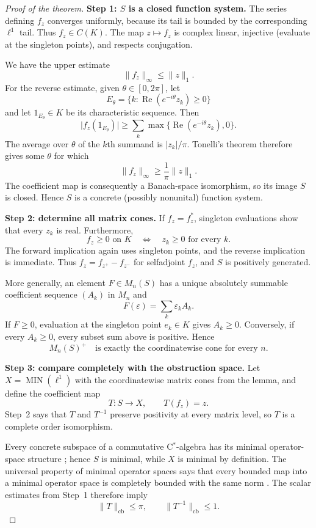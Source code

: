 \documentclass[11pt]{article}
\theoremstyle{definition}
\newcommand{\MIN}{\operatorname{MIN}}
\begin{document}
\begin{proof}[Proof of the theorem]
\textbf{Step 1: $S$ is a closed function system.}
The series defining $f_z$ converges uniformly, because its tail is bounded by
the corresponding $\ell^1$ tail.  Thus $f_z\in C(K)$.  The map
$z\mapsto f_z$ is complex linear, injective (evaluate at the singleton
points), and respects conjugation.

We have the upper estimate
\[
 \|f_z\|_\infty\leq\|z\|_1.
\]
For the reverse estimate, given $\theta\in[0,2\pi]$, let
\[
 E_\theta=\{k:\operatorname{Re}(e^{-i\theta}z_k)\geq0\}
\]
and let $1_{E_\theta}\in K$ be its characteristic sequence.  Then
\[
 \bigl|f_z(1_{E_\theta})\bigr|
 \geq \sum_k\max\{\operatorname{Re}(e^{-i\theta}z_k),0\}.
\]
The average over $\theta$ of the $k$th summand is $|z_k|/\pi$.
Tonelli's theorem therefore gives some $\theta$ for which
\[
  \|f_z\|_\infty\geq\frac1\pi\|z\|_1.
\]
The coefficient map is consequently a Banach-space isomorphism, so its image
$S$ is closed.  Hence $S$ is a concrete (possibly nonunital) function system.

\textbf{Step 2: determine all matrix cones.}
If $f_z=f_z^*$, singleton evaluations show that every $z_k$ is real.
Furthermore,
\[
 f_z\geq0 \text{ on }K
 \quad\Longleftrightarrow\quad z_k\geq0\text{ for every }k.
\]
The forward implication again uses singleton points, and the reverse
implication is immediate.  Thus $f_z=f_{z^+}-f_{z^-}$ for selfadjoint $f_z$,
and $S$ is positively generated.

More generally, an element $F\in M_n(S)$ has a unique absolutely summable
coefficient sequence $(A_k)$ in $M_n$ and
\[
 F(\varepsilon)=\sum_k\varepsilon_kA_k.
\]
If $F\geq0$, evaluation at the singleton point $e_k\in K$ gives $A_k\geq0$.
Conversely, if every $A_k\geq0$, every subset sum above is positive.  Hence
\[
  M_n(S)^+\quad\text{is exactly the coordinatewise cone for every }n.
\]

\textbf{Step 3: compare completely with the obstruction space.}
Let $X=\MIN(\ell^1)$ with the coordinatewise matrix cones from the lemma, and
define the coefficient map
\[
 T:S\longrightarrow X,
 \qquad T(f_z)=z.
\]
Step~2 says that $T$ and $T^{-1}$ preserve positivity at every matrix level,
so $T$ is a complete order isomorphism.

Every concrete subspace of a commutative C$^*$-algebra has its minimal
operator-space structure \cite[Proposition~3.3.1]{paulsen}; hence $S$ is
minimal, while $X$ is minimal by definition.  The universal property of
minimal operator spaces says that every bounded map into a minimal operator
space is completely bounded with the same norm \cite{blecher}.  The scalar
estimates from Step~1 therefore imply
\[
 \|T\|_{\mathrm{cb}}\leq\pi,
 \qquad \|T^{-1}\|_{\mathrm{cb}}\leq1.
\]


\end{proof}
\end{document}
